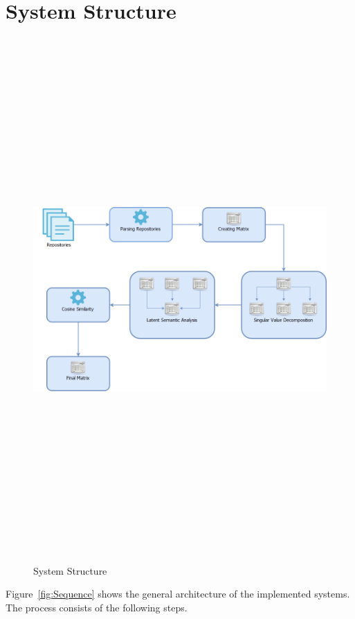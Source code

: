 \section{System Structure}

\begin{figure}[!h]
\includegraphics[width=15cm,height=20cm,keepaspectratio]{images/Architecture.png}
\caption{System Structure}
\label{fig:SystemStructure}
\end{figure}

Figure~\ref{fig:Sequence} shows the general architecture of the implemented systems. The process consists of the following steps. %

